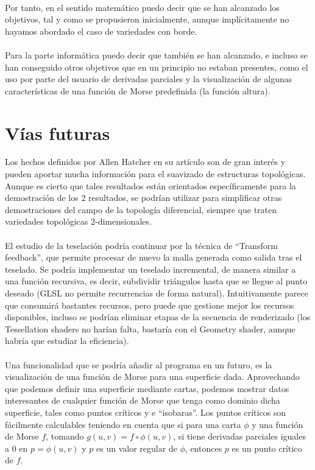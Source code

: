 \\Por tanto, en el sentido matemático puedo decir que se han alcanzado los objetivos, tal y como se propusieron inicialmente, aunque implícitamente no hayamos abordado el caso de variedades con borde.\\
\\Para la parte informática puedo decir que también se han alcanzado, e incluso se han conseguido otros objetivos que en un principio no estaban presentes, como el uso por parte del usuario de derivadas parciales y la visualización de algunas características de una función de Morse predefinida (la función altura).\\

\section*{Vías futuras}
Los hechos definidos por Allen Hatcher en su artículo son de gran interés y pueden aportar mucha información para el suavizado de estructuras topológicas. Aunque es cierto que tales resultados están orientados específicamente para la demostración de los $2$ resultados, se podrían utilizar para simplificar otras demostraciones del campo de la topología diferencial, siempre que traten variedades topológicas $2$-dimensionales.\\
\\El estudio de la teselación podría continuar por la técnica de ``Transform feedback'', que permite procesar de nuevo la malla generada como salida tras el teselado. Se podría implementar un teselado incremental, de manera similar a una función recursiva, es decir, subdividir triángulos hasta que se llegue al punto deseado (GLSL no permite recurrencias de forma natural). Intuitivamente parece que consumirá bastantes recursos, pero puede que gestione mejor los recursos disponibles, incluso se podrían eliminar etapas de la secuencia de renderizado (los Tessellation shaders no harían falta, bastaría con el Geometry shader, aunque habría que estudiar la eficiencia).\\
\\Una funcionalidad que se podría añadir al programa en un futuro, es la visualización de una función de Morse para una superficie dada. Aprovechando que podemos definir una superficie mediante cartas, podemos mostrar datos interesantes de cualquier función de Morse que tenga como dominio dicha superficie, tales como puntos críticos y e ``isobaras''. Los puntos críticos son fácilmente calculables teniendo en cuenta que si para una carta $\phi$ y una función de Morse $f$, tomando $g(u,v)=f \circ \phi (u,v)$, si tiene derivadas parciales iguales a $0$ en $p=\phi(u,v)$ y $p$ es un valor regular de $\phi$, entonces $p$ es un punto crítico de $f$.\\
